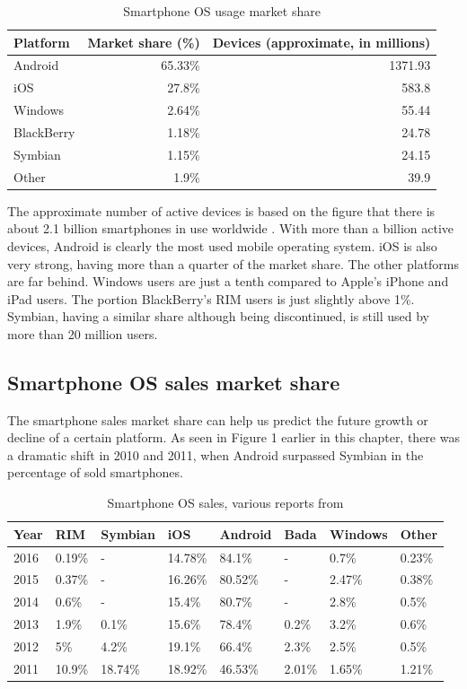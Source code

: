\documentclass[english,master,public,dept460,male,cpdeclaration,oneside]{diploma}
\begin{document}
\begin{table}[hb]
	\centering
	\caption{Smartphone OS usage market share}
	\begin{tabular}{l r r}
		\toprule		
		Platform & Market share (\%) & Devices (approximate, in millions) \\
		\midrule
		Android & 65.33\% & 1371.93 \\
		iOS & 27.8\% & 583.8 \\
		Windows & 2.64\% & 55.44 \\
		BlackBerry & 1.18\% & 24.78 \\
		Symbian & 1.15\% & 24.15\\
		Other & 1.9\% & 39.9\\
		\midrule
	\end{tabular}
\end{table}

The approximate number of active devices is based on the figure that there is about 2.1 billion smartphones in use worldwide \cite{noOfSmartphones}. With more than a billion active devices, Android is clearly the most used mobile operating system. iOS is also very strong, having more than a quarter of the market share. The other platforms are far behind. Windows users are just a tenth compared to Apple’s iPhone and iPad users. The portion BlackBerry’s RIM users is just slightly above 1\%. Symbian, having a similar share although being discontinued, is still used by more than 20 million users.

\subsection{Smartphone OS sales market share}
The smartphone sales market share can help us predict the future growth or decline of a certain platform. As seen in Figure 1 earlier in this chapter, there was a dramatic shift in 2010 and 2011, when Android surpassed Symbian in the percentage of sold smartphones.

\begin{table}
	\centering
	\caption{Smartphone OS sales, various reports from \cite{gartner}}
	\begin{tabular}{l l l l l l l l}
		\toprule
		Year & RIM & Symbian & iOS & Android & Bada & Windows & Other\\
		\midrule		
		2016 & 0.19\% & - & 14.78\% & 84.1\% & - & 0.7\% & 0.23\% \\
		2015 & 0.37\% & - & 16.26\% & 80.52\% & - & 2.47\% & 0.38\% \\
		2014 & 0.6\% & - & 15.4\% & 80.7\% & - & 2.8\% & 0.5\% \\
		2013 & 1.9\% & 0.1\% & 15.6\% & 78.4\% & 0.2\% & 3.2\% & 0.6\% \\
		2012 & 5\% & 4.2\% & 19.1\% & 66.4\% & 2.3\% & 2.5\% & 0.5\% \\
		2011 & 10.9\% & 18.74\% & 18.92\% & 46.53\% & 2.01\% & 1.65\% & 1.21\% \\
		\midrule		
	\end{tabular}
\end{table}
\end{document}
